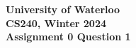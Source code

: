 \documentclass[12pt]{article}
\begin{document}
\begin{center}
  {\Large\textbf{University of Waterloo}}\\
  \vspace{3mm}
  {\Large\textbf{CS240, Winter 2024}}\\
  \vspace{2mm}
  {\Large\textbf{Assignment 0 Question 1}}\\
\end{center}

\begin{align*}
\end{align*}
\end{document}
